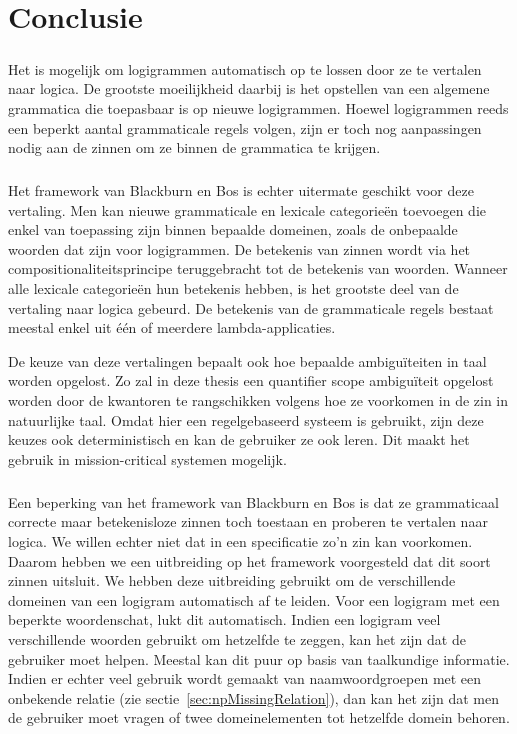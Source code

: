\chapter{Conclusie}
\label{ch:conclusie}

\paragraph{}Het is mogelijk om logigrammen automatisch op te lossen door ze te vertalen naar logica. De grootste moeilijkheid daarbij is het opstellen van een algemene grammatica die toepasbaar is op nieuwe logigrammen. Hoewel logigrammen reeds een beperkt aantal grammaticale regels volgen, zijn er toch nog aanpassingen nodig aan de zinnen om ze binnen de grammatica te krijgen.

\paragraph{}Het framework van Blackburn en Bos \cite{Blackburn2005, Blackburn2006} is echter uitermate geschikt voor deze vertaling. Men kan nieuwe grammaticale en lexicale categorieën toevoegen die enkel van toepassing zijn binnen bepaalde domeinen, zoals de onbepaalde woorden dat zijn voor logigrammen. De betekenis van zinnen wordt via het compositionaliteitsprincipe teruggebracht tot de betekenis van woorden. Wanneer alle lexicale categorieën hun betekenis hebben, is het grootste deel van de vertaling naar logica gebeurd. De betekenis van de grammaticale regels bestaat meestal enkel uit één of meerdere lambda-applicaties.

De keuze van deze vertalingen bepaalt ook hoe bepaalde ambiguïteiten in taal worden opgelost. Zo zal in deze thesis een quantifier scope ambiguïteit opgelost worden door de kwantoren te rangschikken volgens hoe ze voorkomen in de zin in natuurlijke taal. Omdat hier een regelgebaseerd systeem is gebruikt, zijn deze keuzes ook deterministisch en kan de gebruiker ze ook leren. Dit maakt het gebruik in mission-critical systemen mogelijk.

\paragraph{}Een beperking van het framework van Blackburn en Bos is dat ze grammaticaal correcte maar betekenisloze zinnen toch toestaan en proberen te vertalen naar logica. We willen echter niet dat in een specificatie zo'n zin kan voorkomen. Daarom hebben we een uitbreiding op het framework voorgesteld dat dit soort zinnen uitsluit. We hebben deze uitbreiding gebruikt om de verschillende domeinen van een logigram automatisch af te leiden. Voor een logigram met een beperkte woordenschat, lukt dit automatisch. Indien een logigram veel verschillende woorden gebruikt om hetzelfde te zeggen, kan het zijn dat de gebruiker moet helpen. Meestal kan dit puur op basis van taalkundige informatie. Indien er echter veel gebruik wordt gemaakt van naamwoordgroepen met een onbekende relatie (zie sectie~\ref{sec:npMissingRelation}), dan kan het zijn dat men de gebruiker moet vragen of twee domeinelementen tot hetzelfde domein behoren.

